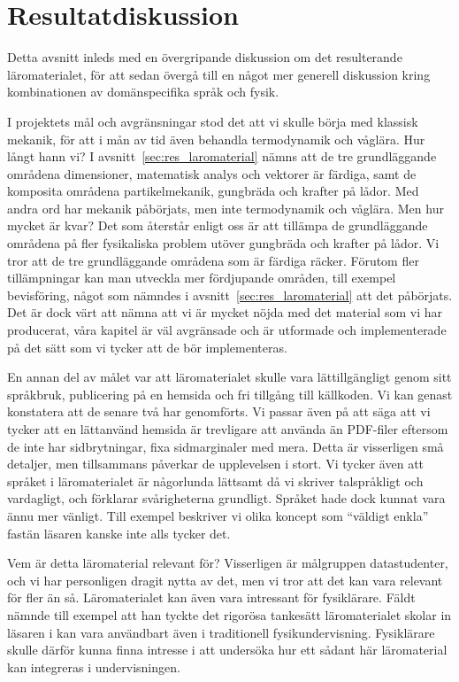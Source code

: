 \section{Resultatdiskussion}\label{sec:res_disk}

Detta avsnitt inleds med en övergripande diskussion om det resulterande
läromaterialet, för att sedan övergå till en något mer generell diskussion kring
kombinationen av domänspecifika språk och fysik.

I projektets mål och avgränsningar stod det att vi skulle börja med klassisk
mekanik, för att i mån av tid även behandla termodynamik och våglära. Hur långt
hann vi? I avsnitt~\ref{sec:res_laromaterial} nämns att de tre grundläggande
områdena dimensioner, matematisk analys och vektorer är färdiga, samt de
komposita områdena partikelmekanik, gungbräda och krafter på lådor. Med andra
ord har mekanik påbörjats, men inte termodynamik och våglära. Men hur mycket är
kvar? Det som återstår enligt oss är att tillämpa de grundläggande områdena på
fler fysikaliska problem utöver gungbräda och krafter på lådor. Vi tror att de
tre grundläggande områdena som är färdiga räcker. Förutom fler tillämpningar kan
man utveckla mer fördjupande områden, till exempel bevisföring, något som
nämndes i avsnitt~\ref{sec:res_laromaterial} att det påbörjats. Det är dock värt
att nämna att vi är mycket nöjda med det material som vi har producerat, våra
kapitel är väl avgränsade och är utformade och implementerade på det sätt som vi
tycker att de bör implementeras. 

En annan del av målet var att läromaterialet skulle vara lättillgängligt genom
sitt språkbruk, publicering på en hemsida och fri tillgång till källkoden.
Vi kan genast konstatera att de senare två har genomförts. Vi passar även på att
säga att vi tycker att en lättanvänd hemsida är trevligare att använda än
PDF-filer eftersom de inte har sidbrytningar, fixa sidmarginaler med mera. Detta
är visserligen små detaljer, men tillsammans påverkar de upplevelsen i stort. Vi
tycker även att språket i läromaterialet är någorlunda lättsamt då vi skriver
talspråkligt och vardagligt, och förklarar svårigheterna grundligt. Språket hade
dock kunnat vara ännu mer vänligt. Till exempel beskriver vi olika koncept som
``väldigt enkla'' fastän läsaren kanske inte alls tycker det.

Vem är detta läromaterial relevant för? Visserligen är målgruppen datastudenter, och vi har personligen dragit nytta av det,
men vi tror att det kan vara relevant för fler än så. Läromaterialet
kan även vara intressant för fysiklärare. Fäldt nämnde till exempel att han
tyckte det rigorösa tankesätt läromaterialet skolar in läsaren i kan vara
användbart även i traditionell fysikundervisning. Fysiklärare skulle därför
kunna finna intresse i att undersöka hur ett sådant här läromaterial kan
integreras i undervisningen.

